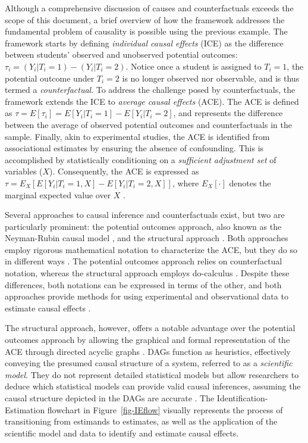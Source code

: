 \documentclass[
  authoryear,
  preprint,
  1p]{elsarticle}
\begin{document}
Although a comprehensive discussion of causes and counterfactuals
exceeds the scope of this document, a brief overview of how the
framework addresses the fundamental problem of causality is possible
using the previous example. The framework starts by defining
\emph{individual causal effects} (ICE) as the difference between
students' observed and unobserved potential outcomes:
\(\tau_{i} = (Y_{i}| T_{i}=1) - (Y_{i}| T_{i}=2)\). Notice once a
student is assigned to \(T_{i}=1\), the potential outcome under
\(T_{i}=2\) is no longer observed nor observable, and is thus termed a
\emph{counterfactual}. To address the challenge posed by
counterfactuals, the framework extends the ICE to \emph{average causal
effects} (ACE). The ACE is defined as
\(\tau = E[\tau_{i}] = E[Y_{i}| T_{i}=1] - E[Y_{i}| T_{i}=2]\), and
represents the difference between the average of observed potential
outcomes and counterfactuals in the sample. Finally, akin to
experimental studies, the ACE is identified from associational estimates
by ensuring the absence of confounding. This is accomplished by
statistically conditioning on a \emph{sufficient adjustment set} of
variables (\(X\)). Consequently, the ACE is expressed as
\(\tau = E_{X}[E[Y_{i}| T_{i}=1, X] - E[Y_{i}| T_{i}=2, X]]\), where
\(E_{X}[\cdot]\) denotes the marginal expected value over \(X\)
\citep{Morgan_et_al_2014}.

Several approaches to causal inference and counterfactuals exist, but
two are particularly prominent: the potential outcomes approach, also
known as the Neyman-Rubin causal model
\citep{Neyman_et_al_1923, Rubin_1974}, and the structural approach
\citep{Pearl_2009, Pearl_et_al_2016}. Both approaches employ rigorous
mathematical notation to characterize the ACE, but they do so in
different ways \citep{Neal_2020}. The potential outcomes approach relies
on counterfactual notation, whereas the structural approach employs
do-calculus \citep{Pearl_2009}. Despite these differences, both
notations can be expressed in terms of the other, and both approaches
provide methods for using experimental and observational data to
estimate causal effects \citep{Pearl_2010}.

The structural approach, however, offers a notable advantage over the
potential outcomes approach by allowing the graphical and formal
representation of the ACE through directed acyclic graphs
\citep[DAG,][]{Pearl_2009, Pearl_et_al_2016, Gross_et_al_2018, Neal_2020}.
DAGs function as heuristics, effectively conveying the presumed causal
structure of a system, referred to as a \emph{scientific model}. They do
not represent detailed statistical models but allow researchers to
deduce which statistical models can provide valid causal inferences,
assuming the causal structure depicted in the DAGs are accurate
\citep{McElreath_2020}. The Identification-Estimation flowchart in
Figure~\ref{fig-IEflow} visually represents the process of transitioning
from estimands to estimates, as well as the application of the
scientific model and data to identify and estimate causal effects.
\end{document}
